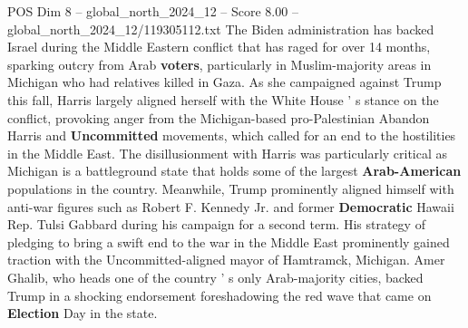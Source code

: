 \begin{textsample}{POS Dim 8 – global\_north\_2024\_12 – Score 8.00 – global\_north\_2024\_12/119305112.txt}
The Biden administration has backed Israel during the Middle Eastern conflict that has raged for over 14 months, sparking outcry from Arab \textbf{voters}, particularly in Muslim-majority areas in Michigan who had relatives killed in Gaza.
As she campaigned against Trump this fall, Harris largely aligned herself with the White House ' s stance on the conflict, provoking anger from the Michigan-based pro-Palestinian Abandon Harris and \textbf{Uncommitted} movements, which called for an end to the hostilities in the Middle East.
The disillusionment with Harris was particularly critical as Michigan is a battleground state that holds some of the largest \textbf{Arab-American} populations in the country.
Meanwhile, Trump prominently aligned himself with anti-war figures such as Robert F.
Kennedy Jr. and former \textbf{Democratic} Hawaii Rep.
Tulsi Gabbard during his campaign for a second term.
His strategy of pledging to bring a swift end to the war in the Middle East prominently gained traction with the Uncommitted-aligned mayor of Hamtramck, Michigan.
Amer Ghalib, who heads one of the country ' s only Arab-majority cities, backed Trump in a shocking endorsement foreshadowing the red wave that came on \textbf{Election} Day in the state.

\end{textsample}
